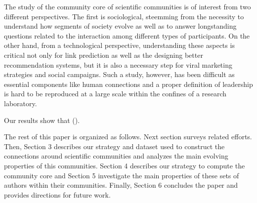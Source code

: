 The study of the community core of scientific communities is of interest from two different perspectives.  The first is sociological, steemming from the necessity to understand how
segments of society evolve as well as to answer longstanding  questions related to the interaction among different types of participants. On the other hand, from a technological perspective,
understanding  these aspects is critical not only for link prediction as well as the designing better recommendation systems, but it is also a necessary step for viral marketing
strategies and social campaigns.  Such a study, however, has been difficult as essential components like human connections and a proper definition of leadership is hard to be
reproduced at a large scale within the confines of a research laboratory.

Our results show that (). 


The rest of this paper is organized as follows. Next section surveys related efforts. Then, Section 3 describes our strategy and dataset used to construct the connections around
scientific communities and analyzes the main evolving properties of this communities.  Section 4 describes our strategy to compute the community core and Section 5 investigate the
main properties of these sets of authors within their communities.  Finally, Section 6 concludes the paper and provides directions for future work. 




